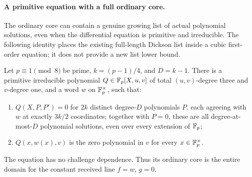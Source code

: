\paragraph{A primitive equation with a full ordinary core.}
The ordinary core can contain a genuine growing list of actual polynomial
solutions, even when the differential equation is primitive and irreducible.
The following identity places the existing full-length Dickson list inside
a cubic first-order equation; it does not provide a new list lower bound.

\begin{proposition}\label{prop:dickson-cubic-ordinary-core}
Let $p\equiv1\pmod8$ be prime, $k=(p-1)/4$, and $D=k-1$.
There is a primitive irreducible polynomial
$Q\in\mathbb F_p[X,u,v]$ of total $(u,v)$-degree three and $v$-degree one,
and a word $w$ on $\mathbb F_p^\times$, such that:
\begin{enumerate}
\item $Q(X,P,P')=0$ for $2k$ distinct degree-$D$ polynomials $P$,
      each agreeing with $w$ at exactly $3k/2$ coordinates; together with
      $P=0$, these are all degree-at-most-$D$ polynomial solutions,
      even over every extension of $\mathbb F_p$;
\item $Q(x,w(x),v)$ is the zero polynomial in $v$ for every
      $x\in\mathbb F_p^\times$.
\end{enumerate}
The equation has no challenge dependence.  Thus its ordinary core is the
entire domain for the constant received line $f=w$, $g=0$.
\end{proposition}
